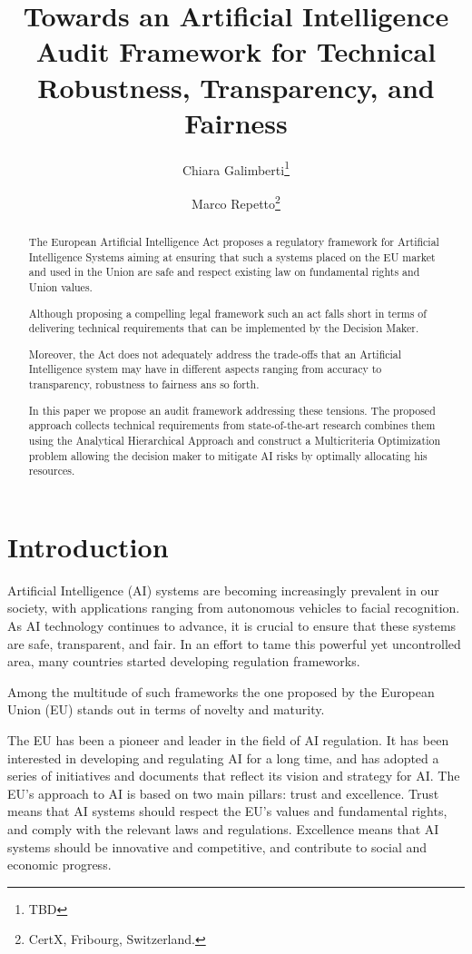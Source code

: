 \documentclass{article}
\title{Towards an Artificial Intelligence Audit Framework for Technical Robustness, Transparency, and Fairness}
\author{Chiara Galimberti\thanks{TBD} \and Marco Repetto\thanks{CertX, Fribourg, Switzerland.}}
\begin{document}
	
	
	\maketitle
	
	
	\begin{abstract}
		
		The European Artificial Intelligence Act proposes a regulatory framework for Artificial Intelligence Systems aiming at ensuring that such a systems placed on the EU market and used in the Union are safe and respect existing law on fundamental rights and Union values.
		
		Although proposing a compelling legal framework such an act falls short in terms of delivering technical requirements that can be implemented by the Decision Maker.
		
		Moreover, the Act does not adequately address the trade-offs that an Artificial Intelligence system may have in different aspects ranging from accuracy to transparency, robustness to fairness ans so forth.

		In this paper we propose an audit framework addressing these tensions. 
		The proposed approach collects technical requirements from state-of-the-art research combines them using the Analytical Hierarchical Approach and construct a Multicriteria Optimization problem allowing the decision maker to mitigate AI risks by optimally allocating his resources. 
			
	\end{abstract}
	
	\section{Introduction}

	Artificial Intelligence (AI) systems are becoming increasingly prevalent in our society, with applications ranging from autonomous vehicles to facial recognition. 
	As AI technology continues to advance, it is crucial to ensure that these systems are safe, transparent, and fair.
	In an effort to tame this powerful yet uncontrolled area, many countries started developing regulation frameworks.
	
	Among the multitude of such frameworks the one proposed by the European Union (EU) stands out in terms of novelty and maturity.
	
	The EU has been a pioneer and leader in the field of AI regulation. 
	It has been interested in developing and regulating AI for a long time, and has adopted a series of initiatives and documents that reflect its vision and strategy for AI. 
	The EU’s approach to AI is based on two main pillars: trust and excellence. 
	Trust means that AI systems should respect the EU’s values and fundamental rights, and comply with the relevant laws and regulations.
	Excellence means that AI systems should be innovative and competitive, and contribute to social and economic progress.
	
\end{document}
